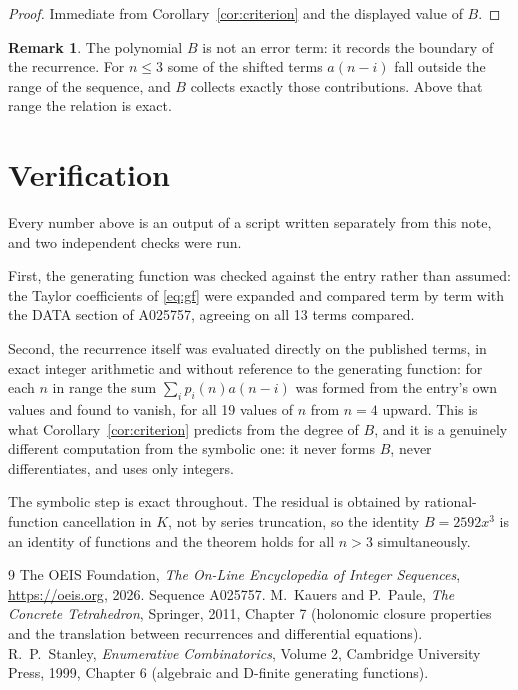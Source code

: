 \documentclass[11pt,a4paper]{article}
\theoremstyle{plain}
\theoremstyle{definition}
\newtheorem{remark}[theorem]{Remark}
\begin{document}
\begin{proof}
Immediate from Corollary~\ref{cor:criterion} and the displayed value of $B$.
\end{proof}

\begin{remark}
The polynomial $B$ is not an error term: it records the boundary of the recurrence. For
$n\le3$ some of the shifted terms $a(n-i)$ fall outside the range of the sequence,
and $B$ collects exactly those contributions. Above that range the relation is exact.
\end{remark}

\section{Verification}

Every number above is an output of a script written separately from this note, and two
independent checks were run.

First, the generating function was checked against the entry rather than assumed: the
Taylor coefficients of \eqref{eq:gf} were expanded and compared term by term with the DATA
section of A025757, agreeing on all 13 terms compared.

Second, the recurrence itself was evaluated directly on the published terms, in exact
integer arithmetic and without reference to the generating function: for each $n$ in range
the sum $\sum_{i}p_{i}(n)a(n-i)$ was formed from the entry's own values and found to
vanish, for all 19 values of $n$ from $n=4$ upward. This is what
Corollary~\ref{cor:criterion} predicts from the degree of $B$, and it is a genuinely
different computation from the symbolic one: it never forms $B$, never differentiates, and
uses only integers.

The symbolic step is exact throughout. The residual is obtained by rational-function
cancellation in $K$, not by series truncation, so the identity $B=2592 x^{3}$ is an
identity of functions and the theorem holds for all $n>3$ simultaneously.

\begin{thebibliography}{9}
 The OEIS Foundation, \emph{The On-Line Encyclopedia of Integer Sequences},
\url{https://oeis.org}, 2026. Sequence A025757.
 M.~Kauers and P.~Paule, \emph{The Concrete Tetrahedron}, Springer, 2011,
Chapter 7 (holonomic closure properties and the translation between recurrences and
differential equations).
 R.~P.~Stanley, \emph{Enumerative Combinatorics}, Volume 2, Cambridge
University Press, 1999, Chapter 6 (algebraic and D-finite generating functions).
\end{thebibliography}
\end{document}
